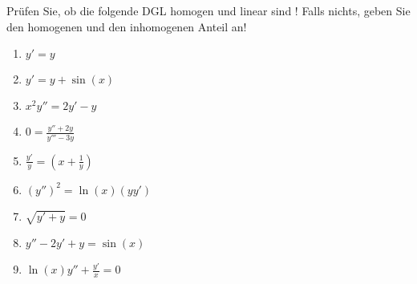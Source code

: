 \item Prüfen Sie, ob die folgende DGL homogen und linear sind ! Falls nichts, geben Sie den homogenen und den inhomogenen Anteil an!

\begin{multicols}{3}
	\begin{enumerate}
		\item $y'=y$
		\item $y'=y+\sin(x)$
		\item $x^2y''=2y'-y$
		\item $0=\frac{y''+2y}{y'''-3y}$
		\item $\frac{y'}{y}=(x+\frac{1}{y})$
		\item $(y'')^2=\ln(x)(yy')$
		\item $\sqrt{y'+y}=0$
		\item $y''-2y'+y=\sin(x)$
		\item $\ln(x)y''+\frac{y'}{x}=0$
	\end{enumerate}
\end{multicols}
